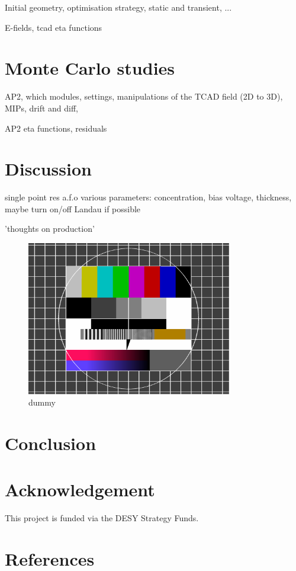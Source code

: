 \documentclass[preprint]{elsarticle}
\begin{document}
Initial geometry, optimisation strategy, static and transient, ...

E-fields, tcad eta functions

\section{Monte Carlo studies}

AP2, which modules, settings, manipulations of the TCAD field (2D to 3D), MIPs, drift and diff, 

AP2 eta functions, residuals

\section{Discussion}

single point res a.f.o various parameters: concentration, bias voltage, thickness, maybe turn on/off Landau if possible

'thoughts on production'

\begin{figure}[t]
  \centering
  \includegraphics[width=0.8\textwidth]{figures/testcard} %
  \caption{dummy}
\label{fig:dummy}
\end{figure}

\section{Conclusion}


\section*{Acknowledgement}
This project is funded via the DESY Strategy Funds.

\small
\section*{References}


\end{document}
